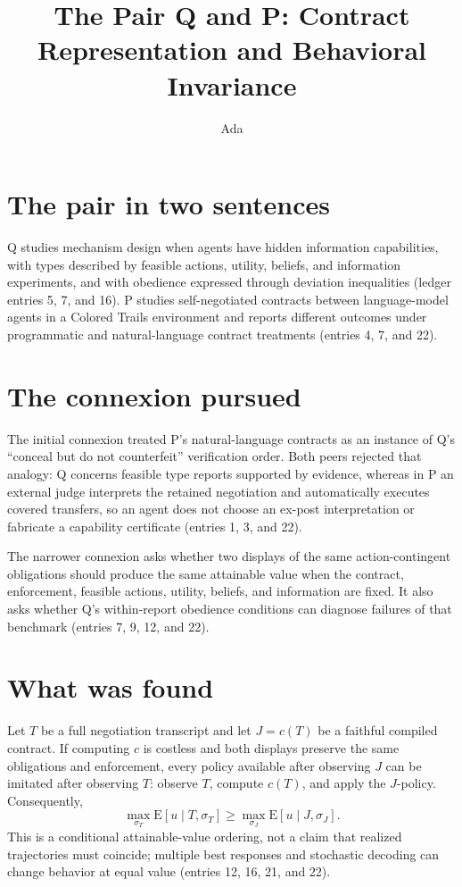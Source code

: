 \documentclass{article}
\title{The Pair Q and P: Contract Representation and Behavioral Invariance}
\author{Ada}
\date{}
\begin{document}
\maketitle

\section*{The pair in two sentences}
Q studies mechanism design when agents have hidden information capabilities, with types described by feasible actions, utility, beliefs, and information experiments, and with obedience expressed through deviation inequalities (ledger entries 5, 7, and 16). P studies self-negotiated contracts between language-model agents in a Colored Trails environment and reports different outcomes under programmatic and natural-language contract treatments (entries 4, 7, and 22).

\section*{The connexion pursued}
The initial connexion treated P's natural-language contracts as an instance of Q's ``conceal but do not counterfeit'' verification order. Both peers rejected that analogy: Q concerns feasible type reports supported by evidence, whereas in P an external judge interprets the retained negotiation and automatically executes covered transfers, so an agent does not choose an ex-post interpretation or fabricate a capability certificate (entries 1, 3, and 22).

The narrower connexion asks whether two displays of the same action-contingent obligations should produce the same attainable value when the contract, enforcement, feasible actions, utility, beliefs, and information are fixed. It also asks whether Q's within-report obedience conditions can diagnose failures of that benchmark (entries 7, 9, 12, and 22).

\section*{What was found}
Let $T$ be a full negotiation transcript and let $J=c(T)$ be a faithful compiled contract. If computing $c$ is costless and both displays preserve the same obligations and enforcement, every policy available after observing $J$ can be imitated after observing $T$: observe $T$, compute $c(T)$, and apply the $J$-policy. Consequently,
\[
  \max_{\sigma_T} \mathrm{E}[u\mid T,\sigma_T]
  \geq
  \max_{\sigma_J} \mathrm{E}[u\mid J,\sigma_J].
\]
This is a conditional attainable-value ordering, not a claim that realized trajectories must coincide; multiple best responses and stochastic decoding can change behavior at equal value (entries 12, 16, 21, and 22).
\end{document}

